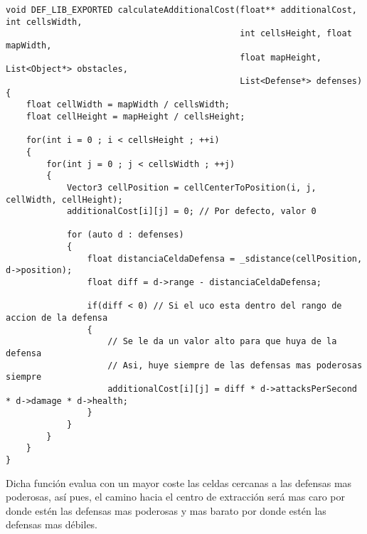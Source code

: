 \lstset{language=C++, texcl=true}
\begin{lstlisting}[frame=single]
void DEF_LIB_EXPORTED calculateAdditionalCost(float** additionalCost, int cellsWidth,
                                              int cellsHeight, float mapWidth,
                                              float mapHeight, List<Object*> obstacles,
                                              List<Defense*> defenses)
{
    float cellWidth = mapWidth / cellsWidth;
    float cellHeight = mapHeight / cellsHeight;
    
    for(int i = 0 ; i < cellsHeight ; ++i)
    {
        for(int j = 0 ; j < cellsWidth ; ++j)
        {
            Vector3 cellPosition = cellCenterToPosition(i, j, cellWidth, cellHeight);
            additionalCost[i][j] = 0; // Por defecto, valor 0
            
            for (auto d : defenses)
            {
                float distanciaCeldaDefensa = _sdistance(cellPosition, d->position);
                float diff = d->range - distanciaCeldaDefensa;
                
                if(diff < 0) // Si el uco esta dentro del rango de accion de la defensa
                {
                    // Se le da un valor alto para que huya de la defensa
                    // Asi, huye siempre de las defensas mas poderosas siempre
                    additionalCost[i][j] = diff * d->attacksPerSecond * d->damage * d->health;
                }
            }
        }
    }
}
\end{lstlisting}

Dicha función evalua con un mayor coste las celdas cercanas a las defensas mas poderosas,
así pues, el camino hacia el centro de extracción será mas caro por donde estén las
defensas mas poderosas y mas barato por donde estén las defensas mas débiles.
